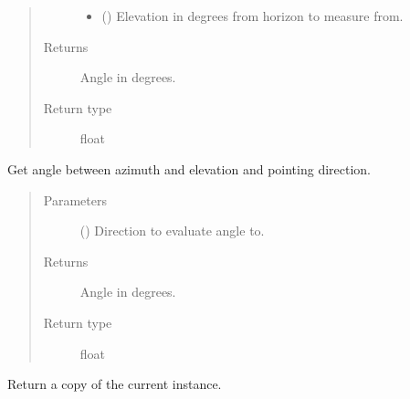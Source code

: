 \documentclass[letterpaper,10pt,english]{sphinxmanual}
\begin{document}
\begin{fulllineitems}
\begin{fulllineitems}
\begin{quote}
\begin{description}
\begin{itemize}
\item {} 
 () \textendash{} Elevation in degrees from horizon to measure from.

\end{itemize}

\item[{Returns}] \leavevmode
Angle in degrees.

\item[{Return type}] \leavevmode
float

\end{description}\end{quote}

\end{fulllineitems}


\begin{fulllineitems}
\label{\detokenize{modules/antenna:antenna.BeamPattern.angle_k}}
Get angle between azimuth and elevation and pointing direction.
\begin{quote}\begin{description}
\item[{Parameters}] \leavevmode
{} () \textendash{} Direction to evaluate angle to.

\item[{Returns}] \leavevmode
Angle in degrees.

\item[{Return type}] \leavevmode
float

\end{description}\end{quote}

\end{fulllineitems}


\begin{fulllineitems}
\label{\detokenize{modules/antenna:antenna.BeamPattern.copy}}
Return a copy of the current instance.

\end{fulllineitems}



\end{fulllineitems}
\end{document}
